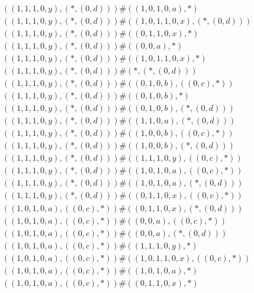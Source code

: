 \begin{align*}
	 & \qquad ((1, 1, 1, 0, y), (*, (0, d))) \# ((1, 0, 1, 0, a), *) \\ 
	 & \qquad ((1, 1, 1, 0, y), (*, (0, d))) \# ((1, 0, 1, 1, 0, x), (*, (0, d))) \\ 
	 & \qquad ((1, 1, 1, 0, y), (*, (0, d))) \# ((0, 1, 1, 0, x), *) \\ 
	 & \qquad ((1, 1, 1, 0, y), (*, (0, d))) \# ((0, 0, a), *) \\ 
	 & \qquad ((1, 1, 1, 0, y), (*, (0, d))) \# ((1, 0, 1, 1, 0, x), *) \\ 
	 & \qquad ((1, 1, 1, 0, y), (*, (0, d))) \# (*, (*, (0, d))) \\ 
	 & \qquad ((1, 1, 1, 0, y), (*, (0, d))) \# ((0, 1, 0, b), ((0, c), *)) \\ 
	 & \qquad ((1, 1, 1, 0, y), (*, (0, d))) \# ((0, 1, 0, b), *) \\ 
	 & \qquad ((1, 1, 1, 0, y), (*, (0, d))) \# ((0, 1, 0, b), (*, (0, d))) \\ 
	 & \qquad ((1, 1, 1, 0, y), (*, (0, d))) \# ((1, 1, 0, a), (*, (0, d))) \\ 
	 & \qquad ((1, 1, 1, 0, y), (*, (0, d))) \# ((1, 0, 0, b), ((0, c), *)) \\ 
	 & \qquad ((1, 1, 1, 0, y), (*, (0, d))) \# ((1, 0, 0, b), (*, (0, d))) \\ 
	 & \qquad ((1, 1, 1, 0, y), (*, (0, d))) \# ((1, 1, 1, 0, y), ((0, c), *)) \\ 
	 & \qquad ((1, 1, 1, 0, y), (*, (0, d))) \# ((1, 0, 1, 0, a), ((0, c), *)) \\ 
	 & \qquad ((1, 1, 1, 0, y), (*, (0, d))) \# ((1, 0, 1, 0, a), (*, (0, d))) \\ 
	 & \qquad ((1, 1, 1, 0, y), (*, (0, d))) \# ((0, 1, 1, 0, x), ((0, c), *)) \\ 
	 & \qquad ((1, 0, 1, 0, a), ((0, c), *)) \# ((0, 1, 1, 0, x), (*, (0, d))) \\ 
	 & \qquad ((1, 0, 1, 0, a), ((0, c), *)) \# ((0, 0, a), ((0, c), *)) \\ 
	 & \qquad ((1, 0, 1, 0, a), ((0, c), *)) \# ((0, 0, a), (*, (0, d))) \\ 
	 & \qquad ((1, 0, 1, 0, a), ((0, c), *)) \# ((1, 1, 1, 0, y), *) \\ 
	 & \qquad ((1, 0, 1, 0, a), ((0, c), *)) \# ((1, 0, 1, 1, 0, x), ((0, c), *)) \\ 
	 & \qquad ((1, 0, 1, 0, a), ((0, c), *)) \# ((1, 0, 1, 0, a), *) \\ 
	 & \qquad ((1, 0, 1, 0, a), ((0, c), *)) \# ((0, 1, 1, 0, x), *) \\ 

\end{align*}
